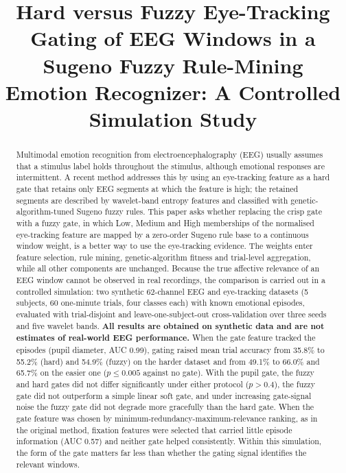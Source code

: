\documentclass[11pt,a4paper]{article}
\title{Hard versus Fuzzy Eye-Tracking Gating of EEG Windows in a Sugeno Fuzzy Rule-Mining Emotion Recognizer: A Controlled Simulation Study}
\author{\pending{Author names and affiliations}}
\date{}
\begin{document}
\maketitle

\begin{abstract}
\noindent
Multimodal emotion recognition from electroencephalography (EEG) usually assumes that a stimulus label holds throughout the stimulus, although emotional responses are intermittent. A recent method addresses this by using an eye-tracking feature as a hard gate that retains only EEG segments at which the feature is high; the retained segments are described by wavelet-band entropy features and classified with genetic-algorithm-tuned Sugeno fuzzy rules. This paper asks whether replacing the crisp gate with a fuzzy gate, in which Low, Medium and High memberships of the normalised eye-tracking feature are mapped by a zero-order Sugeno rule base to a continuous window weight, is a better way to use the eye-tracking evidence. The weights enter feature selection, rule mining, genetic-algorithm fitness and trial-level aggregation, while all other components are unchanged. Because the true affective relevance of an EEG window cannot be observed in real recordings, the comparison is carried out in a controlled simulation: two synthetic 62-channel EEG and eye-tracking datasets (5 subjects, 60 one-minute trials, four classes each) with known emotional episodes, evaluated with trial-disjoint and leave-one-subject-out cross-validation over three seeds and five wavelet bands. \textbf{All results are obtained on synthetic data and are not estimates of real-world EEG performance.} When the gate feature tracked the episodes (pupil diameter, AUC 0.99), gating raised mean trial accuracy from 35.8\% to 55.2\% (hard) and 54.9\% (fuzzy) on the harder dataset and from 49.1\% to 66.0\% and 65.7\% on the easier one ($p\leq0.005$ against no gate). With the pupil gate, the fuzzy and hard gates did not differ significantly under either protocol ($p>0.4$), the fuzzy gate did not outperform a simple linear soft gate, and under increasing gate-signal noise the fuzzy gate did not degrade more gracefully than the hard gate. When the gate feature was chosen by minimum-redundancy-maximum-relevance ranking, as in the original method, fixation features were selected that carried little episode information (AUC 0.57) and neither gate helped consistently. Within this simulation, the form of the gate matters far less than whether the gating signal identifies the relevant windows.
\end{abstract}
\end{document}
